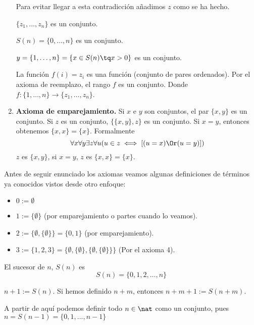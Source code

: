 \begin{enumerate}
		Para evitar llegar a esta contradicción añadimos $z$ como se ha hecho.

		\begin{obs}

			$\{z_1,\hdots, z_n\}$ es un conjunto.

			$S(n) = \{0, \hdots, n\}$ es un conjunto.

			$y=\{1, \hdots, n\} = \{x\in S(n)\tq x>0\}$ es un conjunto.

			La función $f(i) = z_i$ es una función (conjunto de pares ordenados). Por el axioma de reemplazo, el rango $f$ es un conjunto. Donde $f:\{1,\hdots, n\}\to \{z_1, \hdots, z_n\}$.
		\end{obs}

		\item \textbf{Axioma de emparejamiento.} Si $x$ e $y$ son conjuntos, el par $\{x, y\}$ es un conjunto. Si $z$ es un conjunto, $\{\{x,y\},z\}$ es un conjunto. Si $x = y$, entonces obtenemos $\{x,x\} = \{x\}$. Formalmente
		$$\forall x\forall y\exists z\forall u(u\in z\iff \left[(u=x)\Or (u=y)\right])$$
		$z$ es $\{x,y\}$, si $x=y$, $z$ es $\{x,x\}=\{x\}$.
	\end{enumerate}

	Antes de seguir enunciado los axiomas veamos algunas definiciones de términos ya conocidos vistos desde otro enfoque:

	\begin{defn}
	\begin{itemize}
		\item $0:=\emptyset$
		\item $1:=\{\emptyset\}$ (por emparejamiento o partes cuando lo veamos).
		\item $2:=\{\emptyset, \{\emptyset\}\} = \{0,1\}$ (por emparejamiento).
		\item $3:=\{1,2,3\} = \{\emptyset,\{\emptyset\},\{\emptyset, \{\emptyset\}\}\}$ (Por el axioma 4).
	\end{itemize}
	\end{defn}

	\begin{defn}[Sucesor]
		El sucesor de $n$, $S(n)$ es $$S(n) = \{0,1,2,\hdots, n\}$$
	\end{defn}

	\begin{defn}
		$n+1 := S(n)$. Si hemos definido $n+m$, entonces
		$n+m+1 := S(n+m)$.
	\end{defn}

	\obs A partir de aquí podemos definir todo $n\in \nat$ como un conjunto, pues $n=S(n-1)=\{0,1,...,n-1\}$

